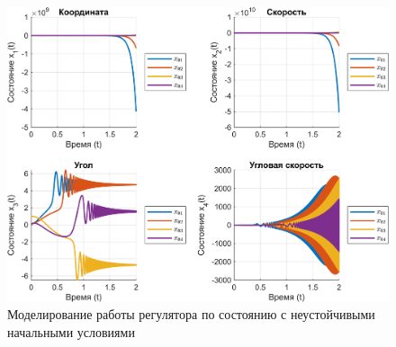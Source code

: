 \begin{figure}[H]
    \centering
    \includegraphics[width=\linewidth]{figs/3.1.badd.png}
    \caption{Моделирование работы регулятора по состоянию с 
    неустойчивыми начальными условиями}
    \label{fig:3.1.badd}
\end{figure}

